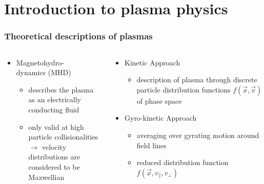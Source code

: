 \documentclass{beamer}
\begin{document}
\section{Introduction to plasma physics}
\begin{frame}
\frametitle{Theoretical descriptions of plasmas}
\vspace{-1.2 cm}
\begin{columns}[onlytextwidth]
	\begin{column}{0.5\textwidth}
		\begin{center}
			\begin{itemize}
			\item Magnetohydro-\\
			dynamics (MHD)
			\begin{itemize}
				\item describes the plasma as an electrically conducting fluid
				\item only valid at high particle collisionalities \\
				$\rightarrow$ velocity distributions are considered to be Maxwellian
			\end{itemize}
			\end{itemize}
		\end{center}
	\end{column}
	\begin{column}{0.5\textwidth}
		\begin{center}
			\begin{itemize}
			\item Kinetic Approach
				\begin{itemize}
						\item description of plasma through discrete particle distribution functions $f(\vec{x},\vec{v})$ of phase space
				\end{itemize}
			\item Gyro-kinetic Approach
				\begin{itemize}
				\item averaging over gyrating motion around field lines
				\item reduced distribution function $f(\vec{x},v_\parallel, v_\perp)$
			\end{itemize}
			\end{itemize}
		\end{center}
	\end{column}
\end{columns}
 \end{frame}
\end{document}
